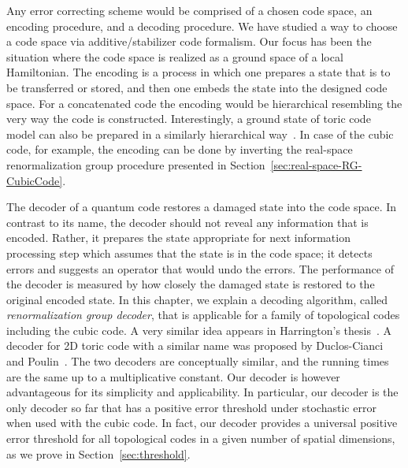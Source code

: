 
Any error correcting scheme would be comprised of a chosen code space,
an encoding procedure, and a decoding procedure.
We have studied a way to choose a code space via additive/stabilizer code formalism.
Our focus has been the situation where the code space is realized as a ground space of a local Hamiltonian.
The encoding is a process in which one prepares a state
that is to be transferred or stored,
and then one embeds the state into the designed code space.
For a concatenated code the encoding would be hierarchical
resembling the very way the code is constructed.
Interestingly, a ground state of toric code model
can also be prepared in a similarly hierarchical way~\cite{AguadoVidal2007Entanglement}.
In case of the cubic code, for example, the encoding can be done
by inverting the real-space renormalization group procedure
presented in Section~\ref{sec:real-space-RG-CubicCode}.

The decoder of a quantum code
restores a damaged state into the code space.
In contrast to its name, the decoder
should not reveal any information that is encoded.
Rather, it prepares the state appropriate for next information processing step
which assumes that the state is in the code space;
it detects errors and suggests an operator that would undo the errors.
The performance of the decoder is measured
by how closely the damaged state is restored to the original encoded state.
In this chapter, we explain a decoding algorithm,
called \emph{renormalization group decoder},
that is applicable for a family of topological codes
including the cubic code.
A very similar idea appears in Harrington's thesis~\cite{Harrington2004thesis}.
A decoder for 2D toric code with a similar name was proposed by 
Duclos-Cianci and Poulin~\cite{Duclos-CianciPoulin2009Fast}.
The two decoders are conceptually similar, and the running times are the same up to a multiplicative constant.
Our decoder is however advantageous 
for its simplicity and applicability.
In particular, our decoder is the only decoder so far
that has a positive error threshold under stochastic error
when used with the cubic code.
In fact, our decoder provides a universal positive error threshold 
for all topological codes in a given number of spatial dimensions,
as we prove in Section~\ref{sec:threshold}.


